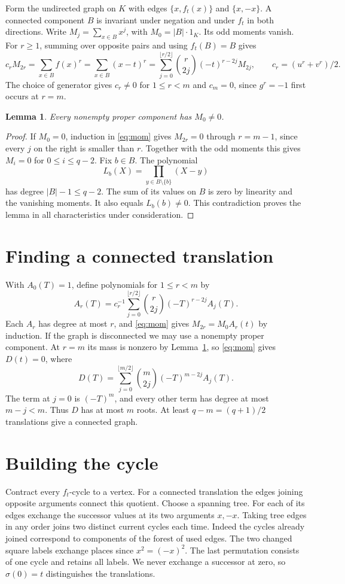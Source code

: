 \documentclass[11pt]{article}
\newtheorem{lemma}[theorem]{Lemma}
\begin{document}
Form the undirected graph on $K$ with edges $\{x,f_t(x)\}$ and $\{x,-x\}$. A connected component $B$ is invariant under negation and under $f_t$ in both directions. Write $M_j=\sum_{x\in B}x^j$, with $M_0=|B|\cdot1_K$. Its odd moments vanish. For $r\ge1$, summing over opposite pairs and using $f_t(B)=B$ gives
\begin{equation}\label{eq:mom}
 c_r M_{2r}=\sum_{x\in B} f(x)^r
 =\sum_{x\in B}(x-t)^r
 =\sum_{j=0}^{\lfloor r/2\rfloor}\binom{r}{2j}(-t)^{r-2j}M_{2j},
 \qquad c_r=(u^r+v^r)/2 .
\end{equation}
The choice of generator gives $c_r\ne0$ for $1\le r<m$ and $c_m=0$, since $g^r=-1$ first occurs at $r=m$.

\begin{lemma}\label{lem:mass}
Every nonempty proper component has $M_0\ne0$.
\end{lemma}
\begin{proof}
If $M_0=0$, induction in \eqref{eq:mom} gives $M_{2r}=0$ through $r=m-1$, since every $j$ on the right is smaller than $r$. Together with the odd moments this gives $M_i=0$ for $0\le i\le q-2$. Fix $b\in B$. The polynomial
\[
 L_b(X)=\prod_{y\in B\setminus\{b\}}(X-y)
\]
has degree $|B|-1\le q-2$. The sum of its values on $B$ is zero by linearity and the vanishing moments. It also equals $L_b(b)\ne0$. This contradiction proves the lemma in all characteristics under consideration.
\end{proof}

\section*{Finding a connected translation}
With $A_0(T)=1$, define polynomials for $1\le r<m$ by
\[
 A_r(T)=c_r^{-1}\sum_{j=0}^{\lfloor r/2\rfloor}
 \binom r{2j}(-T)^{r-2j}A_j(T).
\]
Each $A_r$ has degree at most $r$, and \eqref{eq:mom} gives $M_{2r}=M_0 A_r(t)$ by induction. If the graph is disconnected we may use a nonempty proper component. At $r=m$ its mass is nonzero by Lemma~\ref{lem:mass}, so \eqref{eq:mom} gives $D(t)=0$, where
\[
 D(T)=\sum_{j=0}^{\lfloor m/2\rfloor}\binom m{2j}(-T)^{m-2j}A_j(T).
\]
The term at $j=0$ is $(-T)^m$, and every other term has degree at most $m-j<m$. Thus $D$ has at most $m$ roots. At least $q-m=(q+1)/2$ translations give a connected graph.

\section*{Building the cycle}
Contract every $f_t$-cycle to a vertex. For a connected translation the edges joining opposite arguments connect this quotient. Choose a spanning tree. For each of its edges exchange the successor values at its two arguments $x,-x$. Taking tree edges in any order joins two distinct current cycles each time. Indeed the cycles already joined correspond to components of the forest of used edges. The two changed square labels exchange places since $x^2=(-x)^2$. The last permutation consists of one cycle and retains all labels. We never exchange a successor at zero, so $\sigma(0)=t$ distinguishes the translations.
\end{document}
